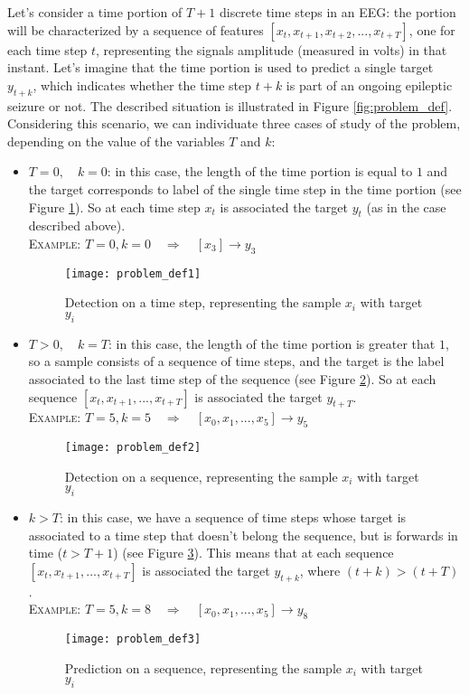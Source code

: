 Let's consider a time portion of $T+1$ discrete time steps in an EEG: the portion will be characterized by a sequence of features $[x_t, x_{t+1}, x_{t+2}, ... , x_{t+T}]$, one for each time step $t$, representing the signals amplitude (measured in volts) in that instant. Let's imagine that the time portion is used to predict a single target $y_{t+k}$, which indicates whether the time step $t+k$ is part of an ongoing epileptic seizure or not. The described situation is illustrated in Figure \ref{fig:problem_def}. Considering this scenario, we can individuate three cases of study of the problem, depending on the value of the variables $T$ and $k$:
\begin{itemize}
    \item $T=0,\quad k=0$: in this case, the length of the time portion is equal to $1$ and the target corresponds to label of the single time step in the time portion (see Figure \ref{fig:problem_def1}). So at each time step $x_t$ is associated the target $y_t$ (as in the case described above).\\
    \textsc{Example:} \quad$T=0, k=0\quad \Rightarrow{}\quad [x_3] \rightarrow{} y_3$
    \begin{figure}[h]
        \centering
        \texttt{[image: problem\_def1]}
        \caption{Detection on a time step, representing the sample $x_i$ with target $y_i$}
        \label{fig:problem_def1}
    \end{figure}
    \item $T>0,\quad k=T$: in this case, the length of the time portion is greater that $1$, so a sample consists of a sequence of time steps, and the target is the label associated to the last time step of the sequence (see Figure \ref{fig:problem_def2}). So at each sequence $[x_t, x_{t+1}, ... , x_{t+T}]$ is associated the target $y_{t+T}$.\\
    \textsc{Example:} \quad$T=5, k=5\quad \Rightarrow{}\quad [x_0, x_1, ..., x_5] \rightarrow{} y_5$
    \begin{figure}[h]
        \centering
        \texttt{[image: problem\_def2]}
        \caption{Detection on a sequence, representing the sample $x_i$ with target $y_i$}
        \label{fig:problem_def2}
    \end{figure}
    \item $k>T$: in this case, we have a sequence of time steps whose target is associated to a time step that doesn't belong the sequence, but is forwards in time ($t>T+1$) (see Figure \ref{fig:problem_def3}). This means that at each sequence $[x_t, x_{t+1}, ... , x_{t+T}]$ is associated the target $y_{t+k}$, where $(t+k) > (t+T)$.\\
    \textsc{Example:} \quad$T=5, k=8\quad \Rightarrow{}\quad [x_0, x_1, ..., x_5] \rightarrow{} y_8$
    \begin{figure}[h]
        \centering
        \texttt{[image: problem\_def3]}
        \caption{Prediction on a sequence, representing the sample $x_i$ with target $y_i$}
        \label{fig:problem_def3}
    \end{figure}
\end{itemize}
